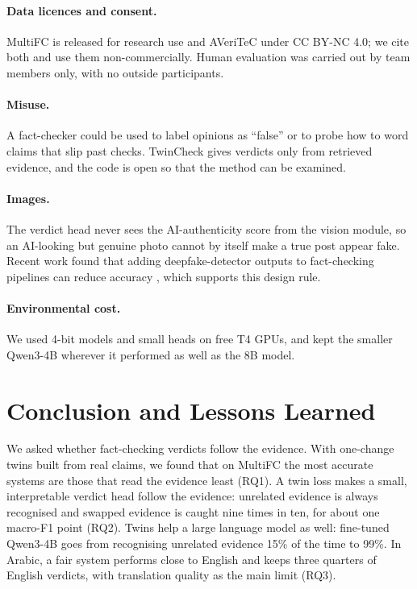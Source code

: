 \documentclass[11pt,a4paper]{article}
\begin{document}
\paragraph{Data licences and consent.}
MultiFC is released for research use and AVeriTeC under CC BY-NC 4.0; we cite both and use them non-commercially. Human evaluation was carried out by team members only, with no outside participants.

\paragraph{Misuse.}
A fact-checker could be used to label opinions as ``false'' or to probe how to word claims that slip past checks. TwinCheck gives verdicts only from retrieved evidence, and the code is open so that the method can be examined.

\paragraph{Images.}
The verdict head never sees the AI-authenticity score from the vision module, so an AI-looking but genuine photo cannot by itself make a true post appear fake. Recent work found that adding deepfake-detector outputs to fact-checking pipelines can reduce accuracy \citep{sagar2026factorfake}, which supports this design rule.

\paragraph{Environmental cost.}
We used 4-bit models and small heads on free T4 GPUs, and kept the smaller Qwen3-4B wherever it performed as well as the 8B model.

\section{Conclusion and Lessons Learned}

We asked whether fact-checking verdicts follow the evidence. With one-change twins built from real claims, we found that on MultiFC the most accurate systems are those that read the evidence least (RQ1). A twin loss makes a small, interpretable verdict head follow the evidence: unrelated evidence is always recognised and swapped evidence is caught nine times in ten, for about one macro-F1 point (RQ2). Twins help a large language model as well: fine-tuned Qwen3-4B goes from recognising unrelated evidence 15\% of the time to 99\%. In Arabic, a fair system performs close to English and keeps three quarters of English verdicts, with translation quality as the main limit (RQ3).
\end{document}
